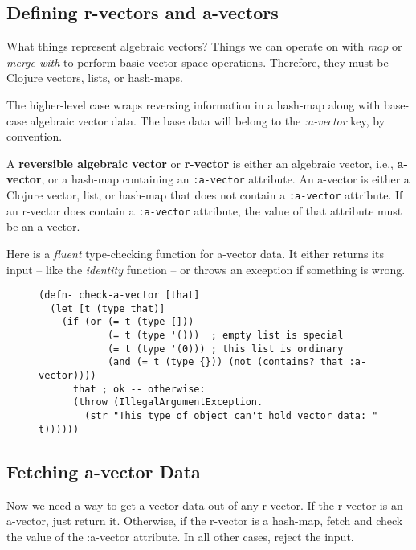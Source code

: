 \documentclass[11pt]{article}
\begin{document}
\subsection{Defining r-vectors and a-vectors}
\label{sec-4-1}

What things represent algebraic vectors?  Things we can operate on
with \emph{map} or \emph{merge-with} to perform basic vector-space operations.
Therefore, they must be Clojure vectors, lists, or hash-maps.

The higher-level case wraps reversing information in a hash-map along
with base-case algebraic vector data. The base data will belong to
the \emph{\mbox{:a-vector}} key, by convention.


\begin{mydefinition}
   A \textbf{reversible algebraic vector} or \textbf{r-vector} is either
   an algebraic vector, i.e., \textbf{a-vector}, or a hash-map containing
   an \texttt{:a-vector} attribute. An a-vector is either a Clojure
   vector, list, or hash-map that does not contain a \mbox{\texttt{:a-vector}}
   attribute. If an r-vector does contain a \texttt{:a-vector}
   attribute, the value of that attribute must be an a-vector.
\end{mydefinition}

Here is a \emph{fluent} type-checking function for a-vector data. It either
returns its input -- like the \emph{identity} function -- or throws an
exception if something is wrong.

\begin{figure}[H]
\label{check-a-vector}
\begin{verbatim}
(defn- check-a-vector [that]
  (let [t (type that)]
    (if (or (= t (type []))
            (= t (type '()))  ; empty list is special
            (= t (type '(0))) ; this list is ordinary
            (and (= t (type {})) (not (contains? that :a-vector))))
      that ; ok -- otherwise:
      (throw (IllegalArgumentException.
        (str "This type of object can't hold vector data: " t))))))
\end{verbatim}
\end{figure}
\subsection{Fetching a-vector Data}
\label{sec-4-2}

Now we need a way to get a-vector data out of any r-vector. If the
r-vector is an a-vector, just return it. Otherwise, if the r-vector
is a hash-map, fetch and check the value of the \mbox{:a-vector}
attribute. In all other cases, reject the input.
\end{document}
